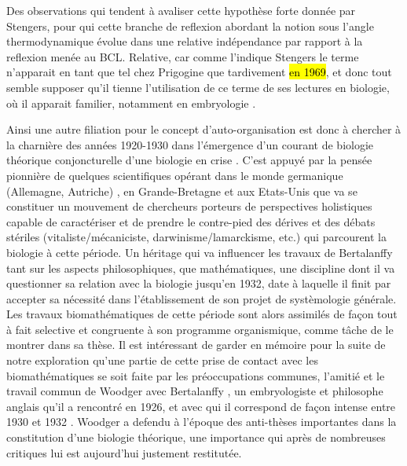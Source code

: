 Des observations qui tendent à avaliser cette hypothèse forte donnée par Stengers, pour qui cette branche de reflexion abordant la notion sous l'angle thermodynamique évolue dans une relative indépendance par rapport à la reflexion menée au BCL. Relative, car comme l'indique Stengers le terme n'apparait en tant que tel chez Prigogine que tardivement \hl{en 1969}, et donc tout semble supposer qu'il tienne l'utilisation de ce terme de ses lectures en biologie, où il apparait familier, notamment en embryologie \autocite[64]{CREA1985}. 

Ainsi une autre filiation pour le concept d'auto-organisation \autocite[68]{CREA1985} est donc à chercher à la charnière des années 1920-1930 dans l'émergence d'un courant de biologie théorique conjoncturelle d'une biologie en crise \autocites[421-434]{Pouvreau2013}. C'est appuyé par la pensée pionnière de quelques scientifiques opérant dans le monde germanique (Allemagne, Autriche) \autocite{Drack2007b}, en Grande-Bretagne et aux Etats-Unis que va se constituer un mouvement de chercheurs porteurs de perspectives holistiques capable de caractériser et de prendre le contre-pied des dérives et des débats stériles (vitaliste/mécaniciste, darwinisme/lamarckisme, etc.) qui parcourent la biologie à cette période. \autocite[153-154]{Pouvreau2013} Un héritage qui va influencer les travaux de Bertalanffy tant sur les aspects philosophiques, que mathématiques, une discipline dont il va questionner sa relation avec la biologie \autocite{Pouvreau2005} jusqu'en 1932, date à laquelle il finit par accepter sa nécessité dans l'établissement de son projet de systèmologie générale. Les travaux biomathématiques de cette période sont alors assimilés de façon tout à fait selective et congruente à son programme organismique, comme tâche de le montrer \textcite[515]{Pouvreau2013} dans sa thèse. Il est intéressant de garder en mémoire pour la suite de notre exploration qu'une partie de cette prise de contact avec les biomathématiques se soit faite par les préoccupations communes, l'amitié et le travail commun de Woodger avec Bertalanffy \autocite[347,433]{Pouvreau2013}, un embryologiste et philosophe anglais qu'il a rencontré en 1926, et avec qui il correspond de façon intense entre 1930 et 1932 \autocite[165]{Pouvreau2013}. Woodger a defendu à l'époque des anti-thèses importantes dans la constitution d'une biologie théorique, une importance qui après de nombreuses critiques lui est aujourd'hui justement restitutée. \autocite{Nicholson2013}

